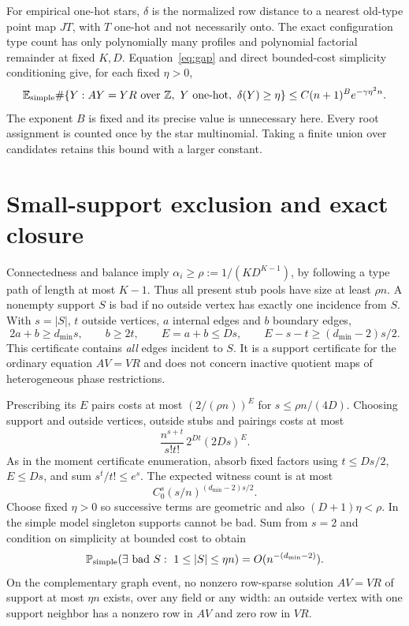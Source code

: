 \documentclass[11pt]{article}
\newcommand{\E}{\mathbb E}
\newcommand{\Prob}{\mathbb P}
\begin{document}
For empirical one-hot stars, $\delta$ is the normalized row distance to a nearest old-type point map $JT$, with $T$ one-hot and not necessarily onto. The exact configuration type count has only polynomially many profiles and polynomial factorial remainder at fixed $K,D$. Equation~\eqref{eq:gap} and direct bounded-cost simplicity conditioning give, for each fixed $\eta>0$,
\begin{equation}\label{eq:macro}
 \E_{\rm simple}\#\{Y:AY=YR\text{ over }\mathbb Z,\ Y\text{ one-hot},\ \delta(Y)\ge\eta\}
 \le C(n+1)^B e^{-\gamma\eta^2n}.
\end{equation}
The exponent $B$ is fixed and its precise value is unnecessary here. Every root assignment is counted once by the star multinomial. Taking a finite union over candidates retains this bound with a larger constant.

\section{Small-support exclusion and exact closure}
Connectedness and balance imply $\alpha_i\ge\rho:=1/(KD^{K-1})$, by following a type path of length at most $K-1$. Thus all present stub pools have size at least $\rho n$. A nonempty support $S$ is bad if no outside vertex has exactly one incidence from $S$. With $s=|S|$, $t$ outside vertices, $a$ internal edges and $b$ boundary edges,
\[
 2a+b\ge d_{\min}s,\qquad b\ge2t,\qquad
 E=a+b\le Ds,\qquad E-s-t\ge(d_{\min}-2)s/2.
\]
This certificate contains \emph{all} edges incident to $S$. It is a support certificate for the ordinary equation $AV=VR$ and does not concern inactive quotient maps of heterogeneous phase restrictions.

Prescribing its $E$ pairs costs at most $(2/(\rho n))^E$ for $s\le\rho n/(4D)$. Choosing support and outside vertices, outside stubs and pairings costs at most
\[
 \frac{n^{s+t}}{s!t!}\,2^{Dt}(2Ds)^E.
\]
As in the moment certificate enumeration, absorb fixed factors using $t\le Ds/2$, $E\le Ds$, and sum $s^t/t!\le e^s$. The expected witness count is at most
\[
 C_0^s(s/n)^{(d_{\min}-2)s/2}.
\]
Choose fixed $\eta>0$ so successive terms are geometric and also $(D+1)\eta<\rho$. In the simple model singleton supports cannot be bad. Sum from $s=2$ and condition on simplicity at bounded cost to obtain
\begin{equation}\label{eq:support}
 \Prob_{\rm simple}(\exists\text{ bad }S:\ 1\le|S|\le\eta n)
 =O(n^{-(d_{\min}-2)}).
\end{equation}
On the complementary graph event, no nonzero row-sparse solution $AV=VR$ of support at most $\eta n$ exists, over any field or any width: an outside vertex with one support neighbor has a nonzero row in $AV$ and zero row in $VR$.
\end{document}
